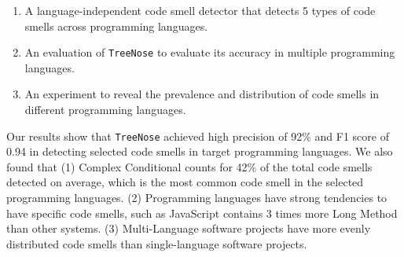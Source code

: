 \begin{enumerate}

    \item A language-independent code smell detector that detects 5 types of
        code smells across programming languages.

    \item An evaluation of \texttt{TreeNose} to evaluate its accuracy in
        multiple programming languages.

    \item An experiment to reveal the prevalence and distribution of code smells
        in different programming languages.

\end{enumerate}

Our results show that \texttt{TreeNose} achieved high precision of 92\% and F1
score of 0.94 in detecting selected code smells in target programming languages.
We also found that (1) Complex Conditional counts for 42\% of the total code
smells detected on average, which is the most common code smell in the selected
programming languages. (2) Programming languages have strong tendencies to have
specific code smells, such as JavaScript contains 3 times more Long Method than
other systems. (3) Multi-Language software projects have more evenly distributed
code smells than single-language software projects.
